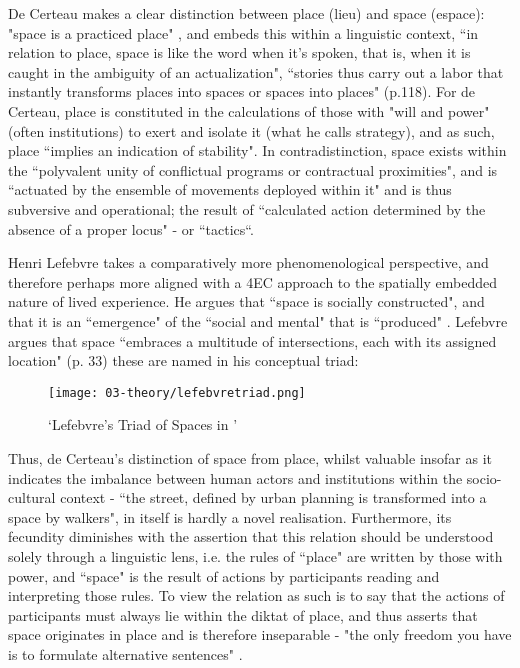 De Certeau makes a clear distinction between place (lieu) and space (espace): "space is a practiced place" \citeyearpar[p. 117]{decerteau1984}, and embeds this within a linguistic context, ``in relation to place, space is like the word when it's spoken, that is, when it is caught in the ambiguity of an actualization", ``stories thus carry out a labor that instantly transforms places into spaces or spaces into places" (p.118). For de Certeau, place is constituted in the calculations of those with "will and power" (often institutions) to exert and isolate it (what he calls strategy), and as such, place ``implies an indication of stability". In contradistinction, space exists within the ``polyvalent unity of conflictual programs or contractual proximities", and is ``actuated by the ensemble of movements deployed within it" and is thus subversive and operational; the result of ``calculated action determined by the absence of a proper locus" - or ``tactics``. 

Henri Lefebvre takes a comparatively more phenomenological perspective, and therefore perhaps more aligned with a 4EC approach to the spatially embedded nature of lived experience. He  argues that ``space is socially constructed", and that it is an ``emergence" of the ``social and mental" that is ``produced"  \citeyearpar[p. 260]{lefebvre1991}. Lefebvre argues that space ``embraces a multitude of intersections, each with its assigned location" (p. 33) these are named in his conceptual triad:

\begin{figure}[bth]
    \myfloatalign
    {\texttt{[image: 03-theory/lefebvretriad.png]}}
    \caption[`Lefebvre's Triad of Spaces in (Günzel, 2019, p.14)']{`Lefebvre's Triad of Spaces in \citep[p. 14]{gunzel2019}'}\label{fig: lefebvretriad}
\end{figure}

Thus, de Certeau's distinction of space from place, whilst valuable insofar as it indicates the imbalance between human actors and institutions within the socio-cultural context - ``the street, defined by urban planning is transformed into a space by walkers", in itself is hardly a novel realisation. Furthermore, its fecundity diminishes with the assertion that this relation should be understood solely through a linguistic lens, i.e. the rules of ``place" are written by those with power, and ``space" is the result of actions by participants reading and interpreting those rules. To view the relation as such is to say that the actions of participants must always lie within the diktat of place, and thus asserts that space originates in place and is therefore inseparable - "the only freedom you have is to formulate alternative sentences" \citep{vermeulen2015}. 

